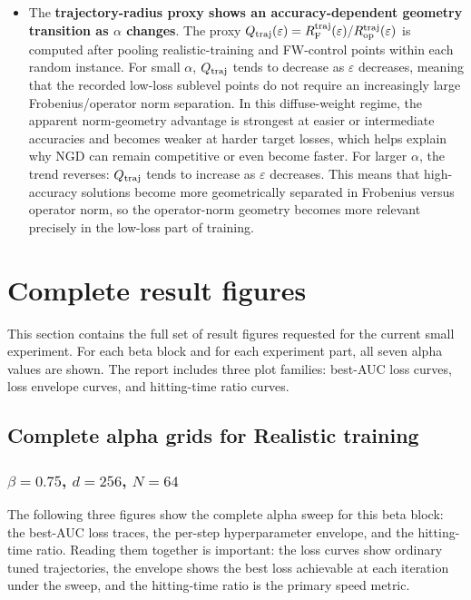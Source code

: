 \documentclass[11pt]{article}
\newcommand{\F}{\mathrm{F}}
\newcommand{\op}{\mathrm{op}}
\newcommand{\eps}{\varepsilon}
\begin{document}
\begin{itemize}
    \item The \textbf{trajectory-radius proxy shows an accuracy-dependent geometry transition as $\alpha$ changes}. The proxy
$Q_{\rm traj}(\eps)=R_{\F}^{\rm traj}(\eps)/R_{\op}^{\rm traj}(\eps)$
is computed after pooling realistic-training and FW-control points within each random instance. For small $\alpha$, $Q_{\rm traj}$ tends to decrease as $\eps$ decreases, meaning that the recorded low-loss sublevel points do not require an increasingly large Frobenius/operator norm separation. In this diffuse-weight regime, the apparent norm-geometry advantage is strongest at easier or intermediate accuracies and becomes weaker at harder target losses, which helps explain why NGD can remain competitive or even become faster. For larger $\alpha$, the trend reverses: $Q_{\rm traj}$ tends to increase as $\eps$ decreases. This means that high-accuracy solutions become more geometrically separated in Frobenius versus operator norm, so the operator-norm geometry becomes more relevant precisely in the low-loss part of training. 
\end{itemize}


\section{Complete result figures}

This section contains the full set of result figures requested for the current small experiment. For each beta block and for each experiment part, all seven alpha values are shown. The report includes three plot families: best-AUC loss curves, loss envelope curves, and hitting-time ratio curves.

\subsection{Complete alpha grids for Realistic training}

\subsubsection{$\beta=0.75$, $d=256$, $N=64$}

The following three figures show the complete alpha sweep for this beta block: the best-AUC loss traces, the per-step hyperparameter envelope, and the hitting-time ratio. Reading them together is important: the loss curves show ordinary tuned trajectories, the envelope shows the best loss achievable at each iteration under the sweep, and the hitting-time ratio is the primary speed metric.
\end{document}
